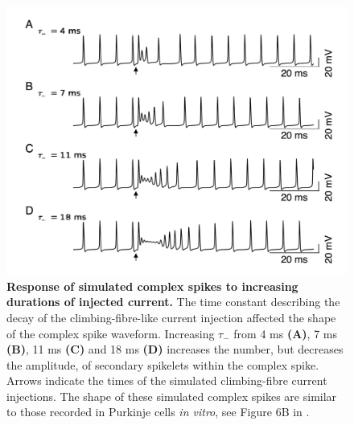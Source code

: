 \documentclass[twocolumn]{svjour3}          %
\begin{document}
\begin{figure}[!ht]
  \includegraphics[width=\linewidth]{Figure4.png}
\caption{\textbf {Response of simulated complex spikes to increasing
    durations of injected current.} The time constant describing the
  decay of the climbing-fibre-like current injection affected the
  shape of the complex spike waveform. Increasing $\tau_-$ from 4 ms
  \textbf{(A)}, 7 ms \textbf{(B)}, 11 ms \textbf{(C)} and 18 ms
  \textbf{(D)} increases the number, but decreases the amplitude, of
  secondary spikelets within the complex spike. Arrows indicate the times
  of the simulated climbing-fibre current injections. The shape of
  these simulated complex spikes are similar to those recorded in
  Purkinje cells \textit{in vitro}, see Figure 6B in
  \protect\citet{MonsivaisEtAl2005}.
\label{fig:injection_durations}}
\end{figure}
\end{document}
